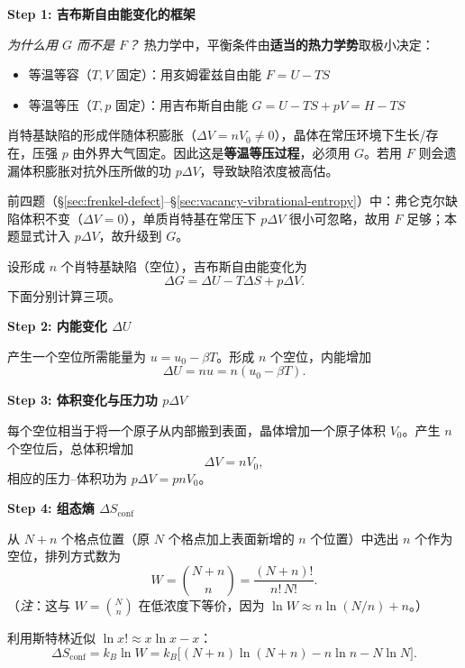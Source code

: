 \begin{derivationbox}[标准解题过程]
\textbf{Step 1: 吉布斯自由能变化的框架}

\textit{为什么用 $G$ 而不是 $F$？} 热力学中，平衡条件由\textbf{适当的热力学势}取极小决定：
\begin{itemize}
    \item 等温等容（$T,V$ 固定）：用亥姆霍兹自由能 $F=U-TS$
    \item 等温等压（$T,p$ 固定）：用吉布斯自由能 $G=U-TS+pV=H-TS$
\end{itemize}
肖特基缺陷的形成伴随体积膨胀（$\Delta V=nV_0\neq 0$），晶体在常压环境下生长/存在，压强 $p$ 由外界大气固定。因此这是\textbf{等温等压过程}，必须用 $G$。若用 $F$ 则会遗漏体积膨胀对抗外压所做的功 $p\Delta V$，导致缺陷浓度被高估。

前四题（\S\ref{sec:frenkel-defect}--\S\ref{sec:vacancy-vibrational-entropy}）中：弗仑克尔缺陷体积不变（$\Delta V=0$），单质肖特基在常压下 $p\Delta V$ 很小可忽略，故用 $F$ 足够；本题显式计入 $p\Delta V$，故升级到 $G$。

设形成 $n$ 个肖特基缺陷（空位），吉布斯自由能变化为
\begin{equation}
\Delta G = \Delta U - T\Delta S + p\Delta V.
\end{equation}
下面分别计算三项。

\textbf{Step 2: 内能变化 $\Delta U$}

产生一个空位所需能量为 $u=u_0-\beta T$。形成 $n$ 个空位，内能增加
\begin{equation}
\Delta U = nu = n(u_0 - \beta T).
\end{equation}

\textbf{Step 3: 体积变化与压力功 $p\Delta V$}

每个空位相当于将一个原子从内部搬到表面，晶体增加一个原子体积 $V_0$。产生 $n$ 个空位后，总体积增加
\begin{equation}
\Delta V = nV_0,
\end{equation}
相应的压力--体积功为 $p\Delta V = pnV_0$。

\textbf{Step 4: 组态熵 $\Delta S_{\mathrm{conf}}$}

从 $N+n$ 个格点位置（原 $N$ 个格点加上表面新增的 $n$ 个位置）中选出 $n$ 个作为空位，排列方式数为
\begin{equation}
W = \binom{N+n}{n} = \frac{(N+n)!}{n!\,N!}.
\end{equation}
（\textit{注}：这与 $W=\binom{N}{n}$ 在低浓度下等价，因为 $\ln W \approx n\ln(N/n)+n$。）

利用斯特林近似 $\ln x! \approx x\ln x - x$：
\begin{equation}
\Delta S_{\mathrm{conf}} = k_{\!B}\ln W = k_{\!B}\bigl[(N+n)\ln(N+n) - n\ln n - N\ln N\bigr].
\end{equation}


\end{derivationbox}
